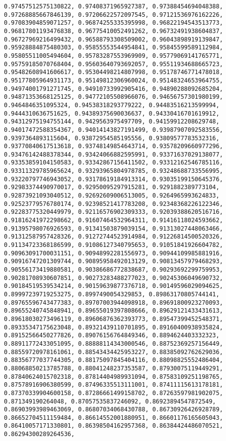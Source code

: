 \documentclass[11pt]{article}
\begin{document}
\begin{Verbatim}[commandchars=\\\{\}]
0.97457512575130822, 0.97408371965927387, 0.97388454694048388, 0.97268885667846139, 0.97206622572097545, 0.97121536976162226, 0.97083904859071257, 0.96874255335395998, 0.96822194543513773, 0.96817801193476838, 0.96775410052491262, 0.96732491938604837, 0.96727969216499432, 0.96588793308509002, 0.96043898919139847, 0.95928884875480303, 0.95855553544954841, 0.95845599589112984, 0.95805511005494604, 0.95783287553969909, 0.95779069141765771, 0.95759185070768404, 0.95603640793692057, 0.95511934688665723, 0.95482608941606617, 0.95304498214807998, 0.95178746771478018, 0.95177805964931173, 0.95149812306960024, 0.95148324653964755, 0.94974001791271745, 0.94910733992905416, 0.94890288092685204, 0.94871353668125125, 0.94772105508966076, 0.94656757301980199, 0.9464846351095324, 0.94538318293779222, 0.94483516213599994, 0.9444310636751625, 0.94389375690036637, 0.94330416701619912, 0.94312975194755144, 0.9429563975497709, 0.94159912208629748, 0.94017472588354367, 0.94014143827191499, 0.93987907092583556, 0.9397364893115604, 0.93872954585195556, 0.93809577783532316, 0.93770840617513618, 0.93748149854643714, 0.93578209660977296, 0.93476142488378344, 0.93424066882595991, 0.93371637029138077, 0.93353859104150583, 0.93342867156411502, 0.93312162546785116, 0.93311329785965624, 0.93293965804978785, 0.93248688733556995, 0.93220797746943052, 0.93178619184913314, 0.93035199150645376, 0.92983374490970017, 0.92950095297915281, 0.9291882389773104, 0.92873921093040512, 0.92692609006513005, 0.9264965993624833, 0.92523779576780174, 0.92398521417783208, 0.92348368226122346, 0.92283775320449979, 0.92116576902309333, 0.92039388620516716, 0.91816241972298662, 0.91607464532964311, 0.91416118024593662, 0.91395798076926593, 0.91341503879039154, 0.91313027448063466, 0.91312587957428326, 0.91272744523914984, 0.91226814500520326, 0.91134723368186599, 0.91086127340795653, 0.91051841926604782, 0.90963091700031151, 0.90948992281556973, 0.90944109985881916, 0.90916747201309744, 0.90895958492013129, 0.90813457979468293, 0.90556173419880581, 0.90386686772838687, 0.90293692299759953, 0.90281708930607851, 0.90273283488277023, 0.90245306049690732, 0.90184519539534214, 0.90159639877376718, 0.90149596029094625, 0.89997239719253275, 0.8997490054329853, 0.89863170805744141, 0.89765596743477383, 0.89707003944098918, 0.89691800923270093, 0.89655240745848941, 0.89655019397808666, 0.89629121433431613, 0.89618030273496119, 0.89606876362393773, 0.89547399452548371, 0.89335347175623048, 0.89321439110701895, 0.89160400938935824, 0.89152566450277826, 0.89076156764849346, 0.8894624403332323, 0.88911772433051095, 0.88888114343000546, 0.88752369257156449, 0.88559720978161061, 0.88543434425953227, 0.88385092762629036, 0.88356777037744305, 0.88175097845404116, 0.88098825552486404, 0.88068850213785788, 0.88041248237353587, 0.87930075119449291, 0.87840624015702318, 0.87814404989931094, 0.87583109251198765, 0.87578916906380599, 0.87496335513111001, 0.87411115613178181, 0.87370339904600158, 0.87286661499158702, 0.87263597981902075, 0.871349190264048, 0.87057535837246092, 0.86923894547872549, 0.86903993989463069, 0.86807034068430788, 0.86730926426928789, 0.86652704511159484, 0.86614552001880951, 0.86601176165605043, 0.86410057171330801, 0.86398504162957368, 0.86384424486070521, 0.86294300289264536, 
\end{Verbatim}
\end{document}

